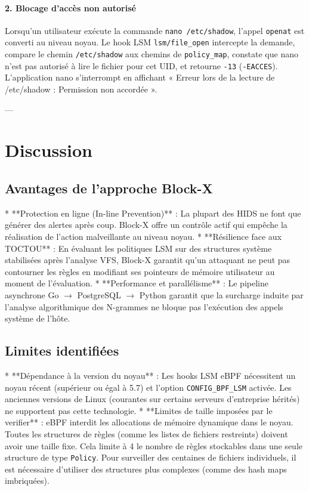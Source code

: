 \documentclass[11pt,a4paper]{article}
\begin{document}
\paragraph{2. Blocage d'accès non autorisé}
Lorsqu'un utilisateur exécute la commande \texttt{nano /etc/shadow}, l'appel \texttt{openat} est converti au niveau noyau. Le hook LSM \texttt{lsm/file\_open} intercepte la demande, compare le chemin \texttt{/etc/shadow} aux chemins de \texttt{policy\_map}, constate que nano n'est pas autorisé à lire le fichier pour cet UID, et retourne \texttt{-13} (\texttt{-EACCES}). L'application nano s'interrompt en affichant « Erreur lors de la lecture de /etc/shadow : Permission non accordée ».

---

\section{Discussion}

\subsection{Avantages de l'approche Block-X}
*   **Protection en ligne (In-line Prevention)** : La plupart des HIDS ne font que générer des alertes après coup. Block-X offre un contrôle actif qui empêche la réalisation de l'action malveillante au niveau noyau.
*   **Résilience face aux TOCTOU** : En évaluant les politiques LSM sur des structures système stabilisées après l'analyse VFS, Block-X garantit qu'un attaquant ne peut pas contourner les règles en modifiant ses pointeurs de mémoire utilisateur au moment de l'évaluation.
*   **Performance et parallélisme** : Le pipeline asynchrone Go $\to$ PostgreSQL $\to$ Python garantit que la surcharge induite par l'analyse algorithmique des N-grammes ne bloque pas l'exécution des appels système de l'hôte.

\subsection{Limites identifiées}
*   **Dépendance à la version du noyau** : Les hooks LSM eBPF nécessitent un noyau récent (supérieur ou égal à 5.7) et l'option \texttt{CONFIG\_BPF\_LSM} activée. Les anciennes versions de Linux (courantes sur certains serveurs d'entreprise hérités) ne supportent pas cette technologie.
*   **Limites de taille imposées par le verifier** : eBPF interdit les allocations de mémoire dynamique dans le noyau. Toutes les structures de règles (comme les listes de fichiers restreints) doivent avoir une taille fixe. Cela limite à 4 le nombre de règles stockables dans une seule structure de type \texttt{Policy}. Pour surveiller des centaines de fichiers individuels, il est nécessaire d'utiliser des structures plus complexes (comme des hash maps imbriquées).
\end{document}
